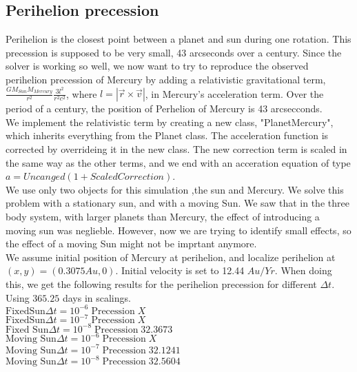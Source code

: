 \documentclass{article}
\begin{document}
\subsection{Perihelion precession}
Perihelion is the closest point between a planet and sun during one rotation. This precession is supposed to be very small, 43 arcseconds over a century. Since the solver is working so well, we now want to try to reproduce the observed perihelion precession of Mercury by adding a relativistic gravitational term,$\frac{GM_{Sun} M_{Mercury}}{r^2} \frac{3l^2}{r^2c^2}$, where $l = |\vec{r} \times \vec{v}|$, in Mercury's acceleration term. Over the period of a century, the position of Perhelion of Mercury is 43 arcsecconds. \\

We implement the relativistic term by creating a new class, "PlanetMercury", which inherits everything from the Planet class. The acceleration function is corrected by overrideing it in the new class. The new correction term is scaled in the same way as the other terms, and we  end with an acceration equation of type $a = Uncanged(1 + ScaledCorrection)$. \\

We use only two objects for this simulation ,the sun and Mercury. We solve this problem with a stationary sun, and with a moving Sun. We saw that in the three body system, with larger planets than Mercury, the effect of introducing a moving sun was neglieble. However, now we are trying to identify small effects, so the effect of a moving Sun might not be imprtant anymore. \\

We assume initial position of Mercury at perihelion, and localize perihelion at $(x,y) = (0.3075 Au, 0)$. Initial velocity is set to 12.44 $Au/Yr$. When doing this, we get the following results for the perihelion precession for different $\Delta t$.\\


Using $365.25$ days in scalings.\\
$\text{FixedSun} \Delta t = 10^{-6}\; \text{Precession}\; X$\\
$\text{FixedSun} \Delta t = 10^{-7}\; \text{Precession}\; X$\\
$\text{Fixed Sun} \Delta t = 10^{-8}\; \text{Precession}\; 32.3673$\\

$\text{Moving Sun} \Delta t = 10^{-6}\; \text{Precession}\; X$\\
$\text{Moving Sun} \Delta t = 10^{-7}\; \text{Precession}\; 32.1241$\\
$\text{Moving Sun} \Delta t = 10^{-8}\; \text{Precession}\; 32.5604$\\
\end{document}
